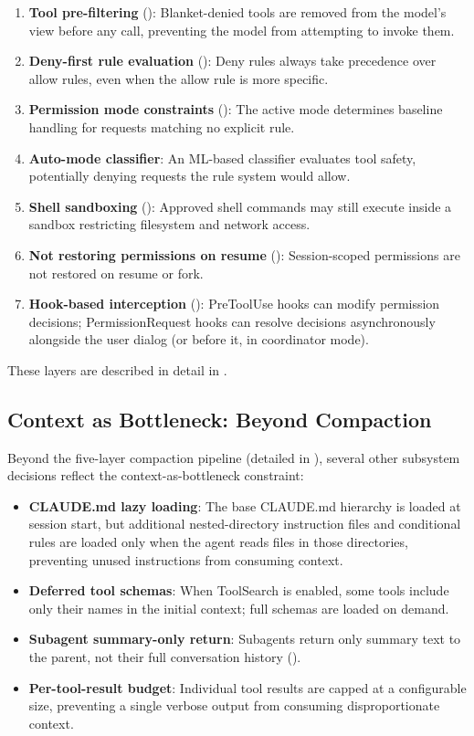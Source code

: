 \begin{enumerate}[nosep]
  \item \textbf{Tool pre-filtering} (): Blanket-denied tools are removed from the model's view before any call, preventing the model from attempting to invoke them.
  \item \textbf{Deny-first rule evaluation} (): Deny rules always take precedence over allow rules, even when the allow rule is more specific.
  \item \textbf{Permission mode constraints} (): The active mode determines baseline handling for requests matching no explicit rule.
  \item \textbf{Auto-mode classifier}: An ML-based classifier evaluates tool safety, potentially denying requests the rule system would allow.
  \item \textbf{Shell sandboxing} (): Approved shell commands may still execute inside a sandbox restricting filesystem and network access.
  \item \textbf{Not restoring permissions on resume} (): Session-scoped permissions are not restored on resume or fork.
  \item \textbf{Hook-based interception} (): PreToolUse hooks can modify permission decisions; PermissionRequest hooks can resolve decisions asynchronously alongside the user dialog (or before it, in coordinator mode).
\end{enumerate}

These layers are described in detail in .

\subsection{Context as Bottleneck: Beyond Compaction}
\label{sec:arch:context-preview}

Beyond the five-layer compaction pipeline (detailed in ), several other subsystem decisions reflect the context-as-bottleneck constraint:

\begin{itemize}[nosep]
  \item \textbf{CLAUDE.md lazy loading}: The base CLAUDE.md hierarchy is loaded at session start, but additional nested-directory instruction files and conditional rules are loaded only when the agent reads files in those directories, preventing unused instructions from consuming context.
  \item \textbf{Deferred tool schemas}: When ToolSearch is enabled, some tools include only their names in the initial context; full schemas are loaded on demand.
  \item \textbf{Subagent summary-only return}: Subagents return only summary text to the parent, not their full conversation history ().
  \item \textbf{Per-tool-result budget}: Individual tool results are capped at a configurable size, preventing a single verbose output from consuming disproportionate context.
\end{itemize}
